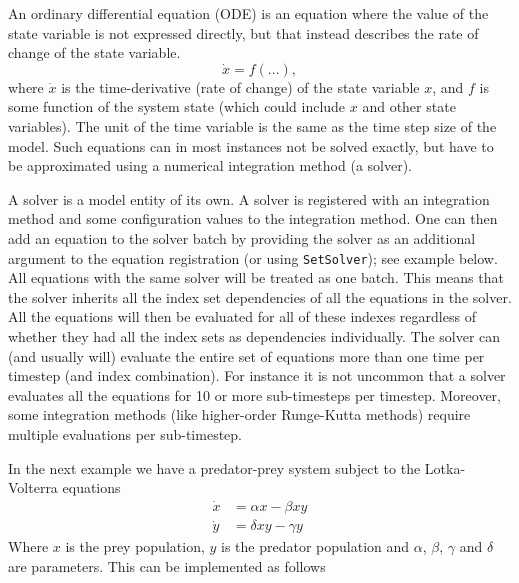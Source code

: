 \documentclass[11pt]{article}
\theoremstyle{definition}
\begin{document}
An ordinary differential equation (ODE)  is an equation where the value of the state variable is not expressed directly, but that instead describes the rate of change of the state variable.
\[
\dot{x} = f(\ldots),
\]
where $\dot{x}$ is the time-derivative (rate of change) of the state variable $x$, and $f$ is some function of the system state (which could include $x$ and other state variables). The unit of the time variable is the same as the time step size of the model. Such equations can in most instances not be solved exactly, but have to be approximated using a numerical integration method (a solver).

A solver is a model entity of its own. A solver is registered with an integration method and some configuration values to the integration method. One can then add an equation to the solver batch by providing the solver as an additional argument to the equation registration (or using {\tt SetSolver}); see example below. All equations with the same solver will be treated as one batch. This means that the solver inherits all the index set dependencies of all the equations in the solver. All the equations will then be evaluated for all of these indexes regardless of whether they had all the index sets as dependencies individually. The solver can (and usually will) evaluate the entire set of equations more than one time per timestep (and index combination). For instance it is not uncommon that a solver evaluates all the equations for 10 or more sub-timesteps per timestep. Moreover, some integration methods (like higher-order Runge-Kutta methods) require multiple evaluations per sub-timestep.

In the next example we have a predator-prey system subject to the Lotka-Volterra equations
\begin{align*}
\dot{x} &= \alpha x - \beta xy\\
\dot{y} &= \delta xy - \gamma y
\end{align*}
Where $x$ is the prey population, $y$ is the predator population and $\alpha$, $\beta$, $\gamma$ and $\delta$ are parameters. This can be implemented as follows
\end{document}
